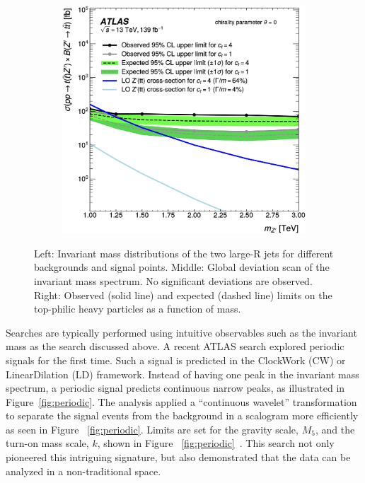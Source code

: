 \documentclass{moriond}
\begin{document}
\begin{figure}[htp]
\begin{subfigure}[b]{0.21\textwidth}
         \label{fig:bump}
     \end{subfigure}
     \begin{subfigure}[b]{0.23\textwidth}
         \centering
         \includegraphics[width=\textwidth]{tttt}
         \label{fig:ttttlimits}
     \end{subfigure}
        \caption{Left: Invariant mass distributions of the two large-R jets for different backgrounds and signal points. Middle: Global deviation scan of the invariant mass spectrum. No significant deviations are observed. Right: Observed (solid line) and expected (dashed line) limits on the top-philic heavy particles as a function of mass\protect\cite{tttt}.}
        \label{fig:tttt}
\end{figure}

Searches are typically performed using intuitive observables such as the
invariant mass as the search discussed above. A recent ATLAS search explored
periodic signals for the first time. Such a signal is predicted in the
ClockWork (CW) or LinearDilation (LD) framework. Instead of having one peak in
the invariant mass spectrum, a periodic signal predicts continuous narrow
peaks, as illustrated in Figure~\ref{fig:periodic}. The analysis applied a
``continuous wavelet'' transformation to separate the signal events from the
background in a scalogram more efficiently as seen in Figure
~\ref{fig:periodic}. Limits are set for the gravity scale, $M_{5}$, and the
turn-on mass scale, $k$, shown in Figure
~\ref{fig:periodic}~\cite{period}. This search not
only pioneered this intriguing signature, but also demonstrated that the data
can be analyzed in a non-traditional space.\\        
\end{document}
